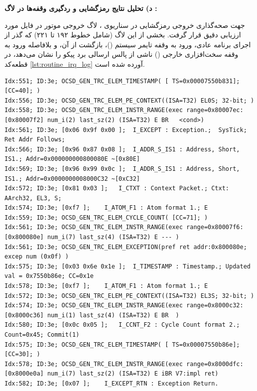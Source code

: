 \vspace{0.4cm}
\noindent
\textbf{د) تحلیل نتایج رمزگشایی و ردگیری وقفه‌ها در لاگ :}\par
جهت صحه‌گذاری خروجی رمزگشایی در سناریوی ، لاگ خروجی موتور  در فایل  مورد ارزیابی دقیق قرار گرفت. بخشی از این لاگ (شامل خطوط ۱۹۲ تا ۲۲۱) که گذر از اجرای برنامه عادی، ورود به وقفه تایمر سیستم ()، بازگشت از آن، و بلافاصله ورود به وقفه سخت‌افزاری خارجی () ناشی از پالس ارسالی برد پیکو را نشان می‌دهد، در قطعه‌کد \ref{lst:routine_irq_log} آورده شده است.

\begin{latin}
\begin{lstlisting}[caption={\rl{نمونه لاگ استخراج‌شده از خروجی دکودر} \lr{OpenCSD} \rl{در آزمون} \lr{Routine\_Irq} \rl{(خطوط ۱۹۲ تا ۲۲۱ فایل} \lr{\texttt{134532.log}}\rl{)}}, label={lst:routine_irq_log}, basicstyle=\ttfamily\scriptsize, breaklines=true]
Idx:551; ID:3e; OCSD_GEN_TRC_ELEM_TIMESTAMP( [ TS=0x00007550b831];  [CC=40]; )
Idx:556; ID:3e; OCSD_GEN_TRC_ELEM_PE_CONTEXT((ISA=T32) EL0S; 32-bit; )
Idx:558; ID:3e; OCSD_GEN_TRC_ELEM_INSTR_RANGE(exec range=0x80007ec:[0x80007f2] num_i(2) last_sz(2) (ISA=T32) E BR   <cond>)
Idx:561; ID:3e; [0x06 0x9f 0x00 ];	I_EXCEPT : Exception.;  SysTick; Ret Addr Follows;
Idx:566; ID:3e; [0x96 0x87 0x08 ];	I_ADDR_S_IS1 : Address, Short, IS1.; Addr=0x000000000800080E ~[0x80E]
Idx:569; ID:3e; [0x96 0x99 0x0c ];	I_ADDR_S_IS1 : Address, Short, IS1.; Addr=0x0000000008000C32 ~[0xC32]
Idx:572; ID:3e; [0x81 0x03 ];	I_CTXT : Context Packet.; Ctxt: AArch32, EL3, S; 
Idx:574; ID:3e; [0xf7 ];	I_ATOM_F1 : Atom format 1.; E
Idx:559; ID:3e; OCSD_GEN_TRC_ELEM_CYCLE_COUNT( [CC=71]; )
Idx:561; ID:3e; OCSD_GEN_TRC_ELEM_INSTR_RANGE(exec range=0x80007f6:[0x800080e] num_i(7) last_sz(4) (ISA=T32) E --- )
Idx:561; ID:3e; OCSD_GEN_TRC_ELEM_EXCEPTION(pref ret addr:0x800080e; excep num (0x0f) )
Idx:575; ID:3e; [0x03 0x6e 0x1e ];	I_TIMESTAMP : Timestamp.; Updated val = 0x7550b86e; CC=0x1e
Idx:578; ID:3e; [0xf7 ];	I_ATOM_F1 : Atom format 1.; E
Idx:572; ID:3e; OCSD_GEN_TRC_ELEM_PE_CONTEXT((ISA=T32) EL3S; 32-bit; )
Idx:574; ID:3e; OCSD_GEN_TRC_ELEM_INSTR_RANGE(exec range=0x8000c32:[0x8000c36] num_i(1) last_sz(4) (ISA=T32) E BR  )
Idx:580; ID:3e; [0x0c 0x05 ];	I_CCNT_F2 : Cycle Count format 2.; Count=0x45; Commit(1)
Idx:575; ID:3e; OCSD_GEN_TRC_ELEM_TIMESTAMP( [ TS=0x00007550b86e];  [CC=30]; )
Idx:578; ID:3e; OCSD_GEN_TRC_ELEM_INSTR_RANGE(exec range=0x8000dfc:[0x8000e0a] num_i(7) last_sz(2) (ISA=T32) E iBR V7:impl ret)
Idx:582; ID:3e; [0x07 ];	I_EXCEPT_RTN : Exception Return.

\end{lstlisting}
\end{latin}
